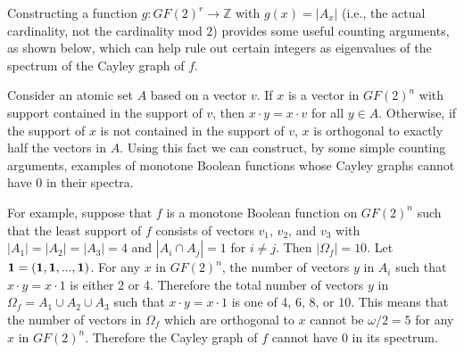 \documentclass[12pt]{article}
\def\zzz{\mathbb{Z}}
\begin{document}
Constructing a function $g: GF(2)^r \rightarrow \zzz$ with $g(x) =
|A_x|$ (i.e., the actual
cardinality, not the cardinality mod $2$) provides some useful
counting arguments, as shown below,
which can help rule out certain integers as eigenvalues of the spectrum of the Cayley graph of $f$.

Consider an atomic set $A$ based on a vector $v$.  If $x$ is a vector
in $GF(2)^n$ with support
contained in the support of $v$, then
$x \cdot y = x \cdot v$ for all $y \in A$.  Otherwise, if the support
of $x$ is not contained in the
support of $v$, $x$ is orthogonal to exactly half the vectors in $A$.
Using this fact we can
construct, by some simple counting arguments, examples of monotone Boolean functions whose
Cayley graphs cannot have 0 in their spectra.

For example, suppose that $f$ is a monotone Boolean function on $GF(2)^n$ such that
the least support of $f$ consists of vectors $v_1$, $v_2$, and $v_3$
with $|A_1|=|A_2|=|A_3|=4$
and $|A_i \cap A_j|=1$ for $i \neq j$.  Then $|\Omega_f|=10$.  Let
$\bf{1}=(1,1,...,1)$.
For any $x$ in $GF(2)^n$, the number of vectors $y$ in $A_i$  such
that $x \cdot y=x \cdot 1$ is
either 2 or 4.  Therefore the total number of vectors $y$ in $\Omega_f
= A_1 \cup A_2 \cup A_3$
such that $x \cdot y = x \cdot 1$ is one of 4, 6, 8, or 10.  This
means that the number of
vectors in $\Omega_f$ which are orthogonal to $x$ cannot be
$\omega/2=5$ for any $x$ in
$GF(2)^n$.  Therefore the Cayley graph of $f$ cannot have $0$ in its
spectrum.
\end{document}
